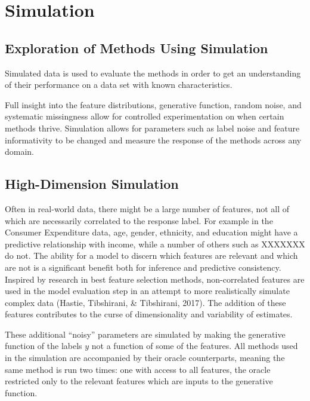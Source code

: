 \documentclass[12pt,twoside]{reedthesis}
\begin{document}
\chapter{Simulation}\label{simulation}

\section{Exploration of Methods Using
Simulation}\label{exploration-of-methods-using-simulation}

Simulated data is used to evaluate the methods in order to get an
understanding of their performance on a data set with known
characteristics.

Full insight into the feature distributions, generative function, random
noise, and systematic missingness allow for controlled experimentation
on when certain methods thrive. Simulation allows for parameters such as
label noise and feature informativity to be changed and measure the
response of the methods across any domain.

\section{High-Dimension Simulation}\label{high-dimension-simulation}

Often in real-world data, there might be a large number of features, not
all of which are necessarily correlated to the response label. For
example in the Consumer Expenditure data, age, gender, ethnicity, and
education might have a predictive relationship with income, while a
number of others such as XXXXXXX do not. The ability for a model to
discern which features are relevant and which are not is a significant
benefit both for inference and predictive consistency. Inspired by
research in best feature selection methods, non-correlated features are
used in the model evaluation step in an attempt to more realistically
simulate complex data (Hastie, Tibshirani, \& Tibshirani, 2017). The
addition of these features contributes to the curse of dimensionality
and variability of estimates.

These additional ``noisy'' parameters are simulated by making the
generative function of the labels \(y\) not a function of some of the
features. All methods used in the simulation are accompanied by their
oracle counterparts, meaning the same method is run two times: one with
access to all features, the oracle restricted only to the relevant
features which are inputs to the generative function.
\end{document}
